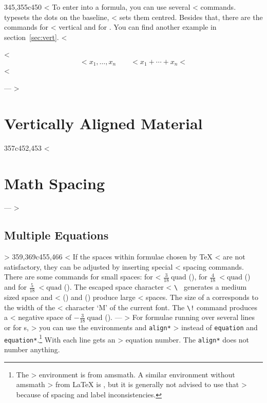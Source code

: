 \begin{example}
345,355c450
< To enter \textbf{} into a formula, you can use several
< commands.  typesets the dots on the baseline, 
< sets them centred. Besides that, there are the commands  for
< vertical and  for . You can find another example in section~\ref{sec:vert}.
< \begin{example}
< \begin{displaymath}
< x_{1},\ldots,x_{n} \qquad
< x_{1}+\cdots+x_{n}
< \end{displaymath}
< \end{example}
---
> \section{Vertically Aligned Material} 
357c452,453
< \section{Math Spacing}
---
> \subsection{Multiple Equations}
> 
359,369c455,466
<  If the spaces within formulae chosen by \TeX{}
< are not satisfactory, they can be adjusted by inserting special
< spacing commands. There are some commands for small spaces: \ci{,} for
< $\frac{3}{18}\:\textrm{quad}$ (\demowidth{0.166em}), \ci{:} for $\frac{4}{18}\:
< \textrm{quad}$ (\demowidth{0.222em}) and \ci{;} for $\frac{5}{18}\:
< \textrm{quad}$ (\demowidth{0.277em}).  The escaped space character
< \verb*.\ . generates a medium sized space and 
< (\demowidth{1em}) and  (\demowidth{2em}) produce large
< spaces. The size of a  corresponds to the width of the
< character `M' of the current font.  The \verb|\!| command produces a
< negative space of $-\frac{3}{18}\:\textrm{quad}$ (\demowidth{0.166em}).
---
> For formulae running over several lines or for s,
> you can use the environments  and \verb|align*|
> instead of \texttt{equation} and \texttt{equation*}.\footnote{The 
>   environment is from \textsf{amsmath}. A similar environment without \textsf{amsmath}
>   from \LaTeX{} is , but it is generally not advised to use that
> because of spacing and label inconsistencies.} With  each line gets an
> equation number. The \verb|align*| does not number anything.

\end{example}
